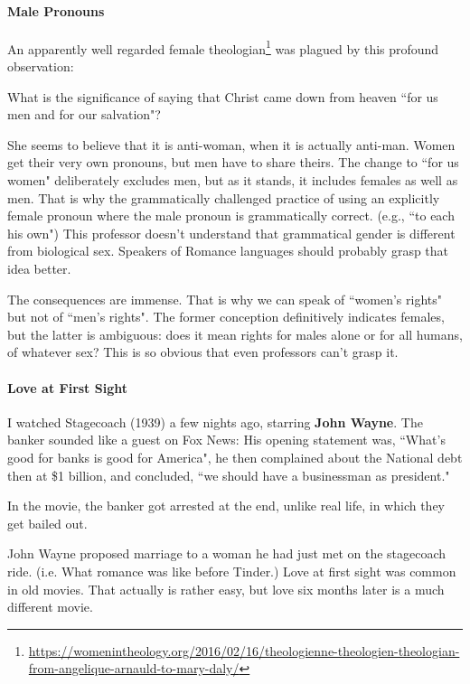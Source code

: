 \paragraph{Male Pronouns}
An apparently well regarded female theologian\footnote{\url{https://womenintheology.org/2016/02/16/theologienne-theologien-theologian-from-angelique-arnauld-to-mary-daly/}} was plagued by this profound observation:

\begin{quotex}
What is the significance of saying that Christ came down from heaven ``for us men and for our salvation"? 

\end{quotex}
She seems to believe that it is anti-woman, when it is actually anti-man. Women get their very own pronouns, but men have to share theirs. The change to ``for us women" deliberately excludes men, but as it stands, it includes females as well as men. That is why the grammatically challenged practice of using an explicitly female pronoun where the male pronoun is grammatically correct. (e.g., ``to each his own") This professor doesn't understand that grammatical gender is different from biological sex. Speakers of Romance languages should probably grasp that idea better.

The consequences are immense. That is why we can speak of ``women's rights" but not of ``men's rights". The former conception definitively indicates females, but the latter is ambiguous: does it mean rights for males alone or for all humans, of whatever sex? This is so obvious that even professors can't grasp it.

\paragraph{Love at First Sight}
I watched Stagecoach (1939) a few nights ago, starring \textbf{John Wayne}. The banker sounded like a guest on Fox News: His opening statement was, ``What's good for banks is good for America", he then complained about the National debt then at \$1 billion, and concluded, ``we should have a businessman as president."

In the movie, the banker got arrested at the end, unlike real life, in which they get bailed out.

John Wayne proposed marriage to a woman he had just met on the stagecoach ride. (i.e. What romance was like before Tinder.) Love at first sight was common in old movies. That actually is rather easy, but love six months later is a much different movie.

